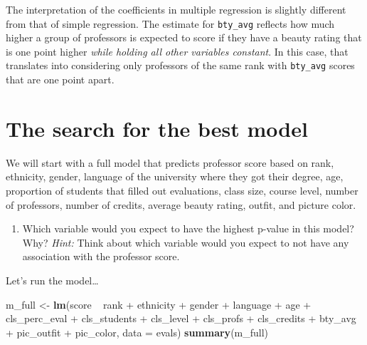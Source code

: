 \documentclass[]{book}
\newenvironment{Shaded}{\begin{snugshade}}{\end{snugshade}}
\newcommand{\KeywordTok}[1]{\textcolor[rgb]{0.13,0.29,0.53}{\textbf{{#1}}}}
\newcommand{\DataTypeTok}[1]{\textcolor[rgb]{0.13,0.29,0.53}{{#1}}}
\newcommand{\StringTok}[1]{\textcolor[rgb]{0.31,0.60,0.02}{{#1}}}
\newcommand{\NormalTok}[1]{{#1}}
\providecommand{\tightlist}{%
  \setlength{\itemsep}{0pt}\setlength{\parskip}{0pt}}
\theoremstyle{definition}
\theoremstyle{definition}
\theoremstyle{remark}
\begin{document}
The interpretation of the coefficients in multiple regression is
slightly different from that of simple regression. The estimate for
\texttt{bty\_avg} reflects how much higher a group of professors is
expected to score if they have a beauty rating that is one point higher
\emph{while holding all other variables constant}. In this case, that
translates into considering only professors of the same rank with
\texttt{bty\_avg} scores that are one point apart.

\section*{The search for the best
model}\label{the-search-for-the-best-model}

We will start with a full model that predicts professor score based on
rank, ethnicity, gender, language of the university where they got their
degree, age, proportion of students that filled out evaluations, class
size, course level, number of professors, number of credits, average
beauty rating, outfit, and picture color.

\begin{enumerate}
\def\labelenumi{\arabic{enumi}.}
\setcounter{enumi}{10}
\tightlist
\item
  Which variable would you expect to have the highest p-value in this
  model? Why? \emph{Hint:} Think about which variable would you expect
  to not have any association with the professor score.
\end{enumerate}

Let's run the model\ldots{}

\begin{Shaded}
\begin{Highlighting}[]
\NormalTok{m_full <-}\StringTok{ }\KeywordTok{lm}\NormalTok{(score ~}\StringTok{ }\NormalTok{rank +}\StringTok{ }\NormalTok{ethnicity +}\StringTok{ }\NormalTok{gender +}\StringTok{ }\NormalTok{language +}\StringTok{ }\NormalTok{age +}\StringTok{ }\NormalTok{cls_perc_eval }
             \NormalTok{+}\StringTok{ }\NormalTok{cls_students +}\StringTok{ }\NormalTok{cls_level +}\StringTok{ }\NormalTok{cls_profs +}\StringTok{ }\NormalTok{cls_credits +}\StringTok{ }\NormalTok{bty_avg }
             \NormalTok{+}\StringTok{ }\NormalTok{pic_outfit +}\StringTok{ }\NormalTok{pic_color, }\DataTypeTok{data =} \NormalTok{evals)}
\KeywordTok{summary}\NormalTok{(m_full)}
\end{Highlighting}
\end{Shaded}
\end{document}
